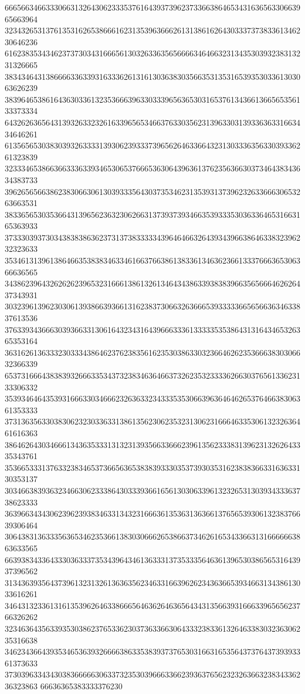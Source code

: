 66656634663330663132643062333537616439373962373366386465343163656330663965663964
32343265313761353162653866616231353963666261313861626430333737383361346230646236
61623835343462373730343166656130326336356566663464663231343530393238313231326665
38343464313866663363393163336261316130363830356635313531653935303361303063626239
38396465386164363033613235366639633033396563653031653761343661366565356133373334
64326263656431393263323261633965653466376330356231396330313933636331663434646261
61356565303830393263333139306239333739656264633664323130333635633039336261323839
32333465386636633363393465306537666536306439636137623563663037346438343634383733
39626565663862383066306130393335643037353462313539313739623263366630653263663531
38336565303536643139656236323062663137393739346635393335303633646531663165363933
37333039373034383838636237313738333334396464663264393439663864633832396232323633
35346131396138646635383834633461663766386138336134636236613337666365306366636565
34386239643262626239653231666138613261346434386339383839663565666462626437343931
30323961396230306139386639366131623837306632636665393333366565663634633837613536
37633934366630393663313061643234316439666333613333353538643131643465326365353164
36316261363332303334386462376238356162353038633032366462623536663830306632366339
65373166643838393266633534373238346364663732623532333362663037656133623133306332
35393464643539316663303466623263633234333535306639636464626537646638306361353333
37313635633038306232303363313861356230623532313062316664633530613232636461616363
38646264303466613436353331313231393566336662396135623338313962313262643335343761
35366533313763323834653736656365383839333035373930353162383836633163633130353137
30346638393632346630623338643033393661656130306339613232653130393433363738623333
36396634343062396239383463313432316663613536313636613765653930613238376639306464
30643831363335636534623536613830306662653866373462616534336631316666663863633565
66393834336433303633373534396434613633313735333564636139653038656531643937396562
31343639356437396132313261363635623463316639626234363665393466313438613033616261
34643132336131613539626463386665646362646365643431356639316663396565623766326262
32346364356339353038623765336230373633663064333238336132646338303236306235316638
34623436643935346536393266663863353839373765303166316535643737643739393361373633
37303963343430383666663063373235303966633662393637656232326366323834336236323863
66636365383333376230
